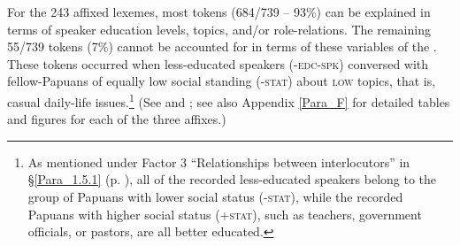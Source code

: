 For the 243 affixed lexemes, most tokens (684/739 – 93\%) can be explained in terms of speaker education levels, topics, and/or role-relations. The remaining 55/739 tokens (7\%) cannot be accounted for in terms of these variables of the . These tokens occurred when less-educated speakers \mbox{(\textsc{-edc-spk})} conversed with fellow-Papuans of equally low social standing (\textsc{-stat}) about \textsc{low} topics, that is, casual daily-life issues.\footnote{As mentioned under Factor 3 ``Relationships between interlocutors'' in §\ref{Para_1.5.1} (p. \pageref{Item_1.3}), all of the recorded less-educated speakers belong to the group of Papuans with lower social status (\textsc{-stat}), while the recorded Papuans with higher social status (\textsc{+stat}), such as teachers, government officials, or pastors, are all better educated.} (See  and ; see also Appendix \ref{Para_F} for detailed tables and figures for each of the three affixes.)





